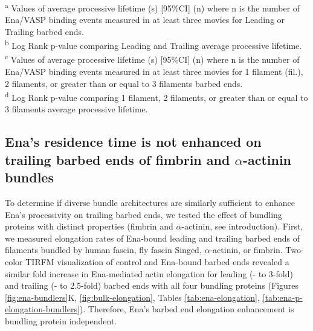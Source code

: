 \begin{table}[hbtp]
{   \textsuperscript{a} Values of average processive lifetime (s) [95\%CI] (n) where n is the number of Ena/VASP binding events measured in at least three movies for Leading or Trailing barbed ends.\\
   \textsuperscript{b} Log Rank p-value comparing Leading and Trailing average processive lifetime. \\
   \textsuperscript{c} Values of average processive lifetime (s) [95\%CI] (n) where n is the number of Ena/VASP binding events measured in at least three movies for 1 filament (fil.), 2 filaments, or greater than or equal to 3 filaments barbed ends. \\
   \textsuperscript{d} Log Rank p-value comparing 1 filament, 2 filaments, or greater than or equal to 3 filaments average processive lifetime.}
\label{tab:ena-processive}
\end{table}

\subsection{Ena's residence time is not enhanced on trailing barbed ends of fimbrin and \texorpdfstring{$\alpha$}{a}-actinin bundles}\label{ena-processive-fimbrin-aact}

To determine if diverse bundle architectures are similarly sufficient to enhance Ena's processivity on trailing barbed ends, we tested the effect of bundling proteins with distinct properties (fimbrin and $\alpha$-actinin, see introduction). First, we measured elongation rates of Ena-bound leading and trailing barbed ends of filaments bundled by human fascin, fly fascin Singed, $\alpha$-actinin, or fimbrin. Two-color TIRFM visualization of control and Ena-bound barbed ends revealed a similar fold increase in Ena-mediated actin elongation for leading (- to 3-fold) and trailing (- to 2.5-fold) barbed ends with all four bundling proteins (Figures \ref{fig:ena-bundlers}K, \ref{fig:bulk-elongation}, Tables \ref{tab:ena-elongation}, \ref{tab:ena-p-elongation-bundlers}). Therefore, Ena's barbed end elongation enhancement is bundling protein independent. 

